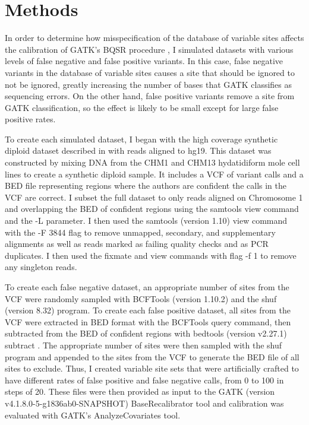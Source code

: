 \section{Methods}

In order to determine how misspecification of the database of variable sites affects the calibration of GATK's BQSR procedure \parencite{auwera_fastq_2013}, I simulated datasets with various levels of false negative and false positive variants. In this case, false negative variants in the database of variable sites causes a site that should be ignored to not be ignored, greatly increasing the number of bases that GATK classifies as sequencing errors. On the other hand, false positive variants remove a site from GATK classification, so the effect is likely to be small except for large false positive rates.

To create each simulated dataset, I began with the high coverage synthetic diploid dataset described in \textcite{li_synthetic-diploid_2018} with reads aligned to hg19. This dataset was constructed by mixing DNA from the CHM1 and CHM13 hydatidiform mole cell lines to create a synthetic diploid sample. It includes a VCF of variant calls and a BED file representing regions where the authors are confident the calls in the VCF are correct. I subset the full dataset to only reads aligned on Chromosome 1 and overlapping the BED of confident regions using the samtools view command \parencite{li_sequence_2009} and the -L parameter. I then used the samtools (version 1.10) view command with the -F 3844 flag to remove unmapped, secondary, and supplementary alignments as well as reads marked as failing quality checks and as PCR duplicates. I then used the fixmate and view commands with flag -f 1 to remove any singleton reads.

To create each false negative dataset, an appropriate number of sites from the VCF were randomly sampled with BCFTools (version 1.10.2) and the shuf (version 8.32) program. To create each false positive dataset, all sites from the VCF were extracted in BED format with the BCFTools query command, then subtracted from the BED of confident regions with bedtools (version v2.27.1) subtract \parencite{quinlan_bedtools_2010}. The appropriate number of sites were then sampled with the shuf program and appended to the sites from the VCF to generate the BED file of all sites to exclude. Thus, I created variable site sets that were artificially crafted to have different rates of false positive and false negative calls, from 0 to 100 in steps of 20.
These files were then provided as input to the GATK (version v4.1.8.0-5-g1836ab0-SNAPSHOT) BaseRecalibrator tool and calibration was evaluated with GATK's AnalyzeCovariates tool.

